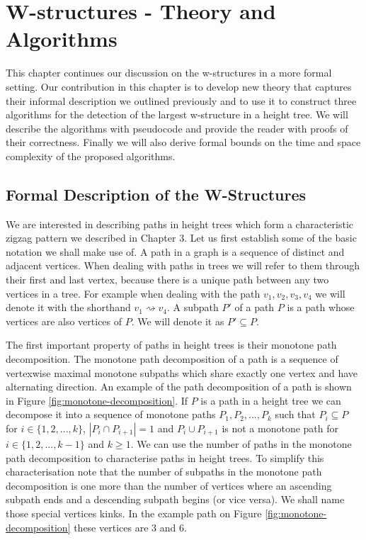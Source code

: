 \chapter{W-structures - Theory and Algorithms}
\label{chapter4}

This chapter continues our discussion on the w-structures in a more formal setting. Our contribution in this chapter is to develop new theory that captures their informal description we outlined previously and to use it to construct three algorithms for the detection of the largest w-structure in a height tree. We will describe the algorithms with pseudocode and provide the reader with proofs of their correctness. Finally we will also derive formal bounds on the time and space complexity of the proposed algorithms.

\section{Formal Description of the W-Structures}

We are interested in describing paths in height trees which form a characteristic zigzag pattern we described in Chapter 3. Let us first establish some of the basic notation we shall make use of. A path in a graph is a sequence of distinct and adjacent vertices. When dealing with paths in trees we will refer to them through their first and last vertex, because there is a unique path between any two vertices in a tree. For example when dealing with the path $v_1, v_2, v_3, v_4$ we will denote it with the shorthand $v_1 \rightsquigarrow v_4$. A subpath $P'$ of a path $P$ is a path whose vertices are also vertices of $P$. We will denote it as $P' \subseteq P$.

The first important property of paths in height trees is their monotone path decomposition. The monotone path decomposition of a path is a sequence of vertexwise maximal monotone subpaths which share exactly one vertex and have alternating direction. An example of the path decomposition of a path is shown in Figure \ref{fig:monotone-decomposition}.
If $P$ is a path in a height tree we can decompose it into a sequence of monotone paths $P_1, P_2, ..., P_k$ such that $P_i \subseteq P$ for $i \in \{1, 2, ..., k\}$, $|P_i \cap P_{i+1}| = 1$ and $P_i \cup P_{i+1}$ is not a monotone path for $i \in \{1, 2, ..., k-1\}$ and $k \ge 1$. We can use the number of paths in the monotone path decomposition to characterise paths in height trees. To simplify this characterisation note that the number of subpaths in the monotone path decomposition is one more than the number of vertices where an ascending subpath ends and a descending subpath begins (or vice versa). We shall name those special vertices kinks. In the example path on Figure \ref{fig:monotone-decomposition} these vertices are $3$ and $6$.

